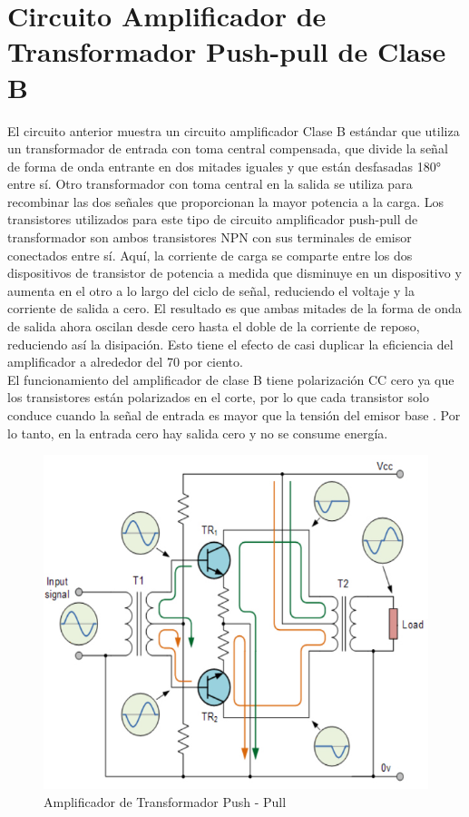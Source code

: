 \documentclass[12pt,a4paper]{article}
\begin{document}
\newpage
\section{Circuito Amplificador de Transformador Push-pull de Clase B}
El circuito anterior muestra un circuito amplificador Clase B estándar que utiliza un transformador de entrada con toma central compensada, que divide la señal de forma de onda entrante en dos mitades iguales y que están desfasadas 180° entre sí. Otro transformador con toma central en la salida se utiliza para recombinar las dos señales que proporcionan la mayor potencia a la carga. Los transistores utilizados para este tipo de circuito amplificador push-pull de transformador son ambos transistores NPN con sus terminales de emisor conectados entre sí.
Aquí, la corriente de carga se comparte entre los dos dispositivos de transistor de potencia a medida que disminuye en un dispositivo y aumenta en el otro a lo largo del ciclo de señal, reduciendo el voltaje y la corriente de salida a cero. El resultado es que ambas mitades de la forma de onda de salida ahora oscilan desde cero hasta el doble de la corriente de reposo, reduciendo así la disipación. Esto tiene el efecto de casi duplicar la eficiencia del amplificador a alrededor del 70 por ciento.\\
El funcionamiento del amplificador de clase B tiene polarización CC cero ya que los transistores están polarizados en el corte, por lo que cada transistor solo conduce cuando la señal de entrada es mayor que la tensión del emisor base . Por lo tanto, en la entrada cero hay salida cero y no se consume energía.\\
\begin{figure}[hbtp]
\centering
\includegraphics[scale=0.5]{Pictures/3.jpg}
\caption{Amplificador de Transformador Push - Pull}
\end{figure}
\end{document}
